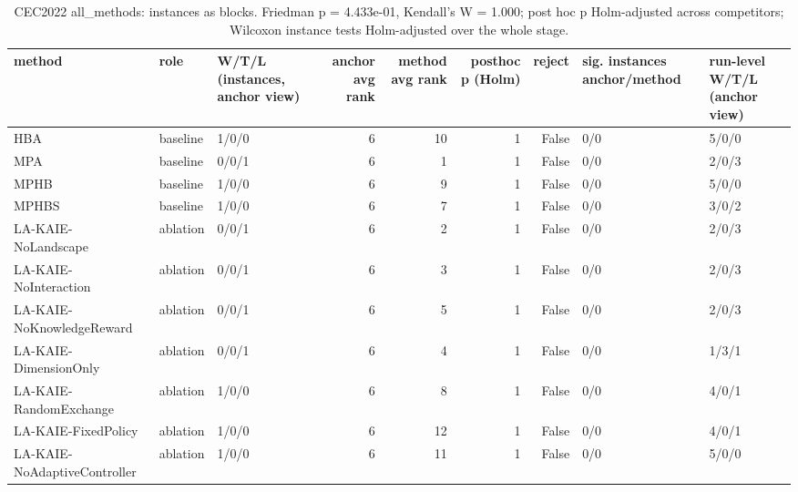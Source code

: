 \begin{table}[t]
\centering
\scriptsize
\caption{CEC2022 all_methods: instances as blocks. Friedman p = 4.433e-01, Kendall's W = 1.000; post hoc p Holm-adjusted across competitors; Wilcoxon instance tests Holm-adjusted over the whole stage.}
\label{tab:cec2022_all_methods_global}
\begin{tabular}{lllrrrrll}
\toprule
method & role & W/T/L (instances, anchor view) & anchor avg rank & method avg rank & posthoc p (Holm) & reject & sig. instances anchor/method & run-level W/T/L (anchor view) \\
\midrule
HBA & baseline & 1/0/0 & 6 & 10 & 1 & False & 0/0 & 5/0/0 \\
MPA & baseline & 0/0/1 & 6 & 1 & 1 & False & 0/0 & 2/0/3 \\
MPHB & baseline & 1/0/0 & 6 & 9 & 1 & False & 0/0 & 5/0/0 \\
MPHBS & baseline & 1/0/0 & 6 & 7 & 1 & False & 0/0 & 3/0/2 \\
LA-KAIE-NoLandscape & ablation & 0/0/1 & 6 & 2 & 1 & False & 0/0 & 2/0/3 \\
LA-KAIE-NoInteraction & ablation & 0/0/1 & 6 & 3 & 1 & False & 0/0 & 2/0/3 \\
LA-KAIE-NoKnowledgeReward & ablation & 0/0/1 & 6 & 5 & 1 & False & 0/0 & 2/0/3 \\
LA-KAIE-DimensionOnly & ablation & 0/0/1 & 6 & 4 & 1 & False & 0/0 & 1/3/1 \\
LA-KAIE-RandomExchange & ablation & 1/0/0 & 6 & 8 & 1 & False & 0/0 & 4/0/1 \\
LA-KAIE-FixedPolicy & ablation & 1/0/0 & 6 & 12 & 1 & False & 0/0 & 4/0/1 \\
LA-KAIE-NoAdaptiveController & ablation & 1/0/0 & 6 & 11 & 1 & False & 0/0 & 5/0/0 \\
\bottomrule
\end{tabular}
\end{table}
